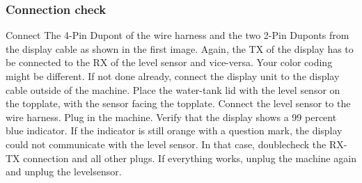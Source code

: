 \documentclass[]{article}
\begin{document}
\subsubsection{Connection check}
\begin{minipage}[t]{0.5\linewidth}
	\vspace{0pt}
	Connect The 4-Pin Dupont of the wire harness and the two 2-Pin Duponts from the display cable as shown in the first image. Again, the TX of the display has to be connected to the RX of the level sensor and vice-versa. Your color coding might be different. If not done already, connect the display unit to the display cable outside of the machine. Place the water-tank lid with the level sensor on the topplate, with the sensor facing the topplate. Connect the level sensor to the wire harness. Plug in the machine. Verify that the display shows a 99 percent blue indicator. If the indicator is still orange with a question mark, the display could not communicate with the level sensor. In that case, doublecheck the RX-TX connection and all other plugs. If everything works, unplug the machine again and unplug the levelsensor.
\end{minipage}
\hfill
\end{document}
